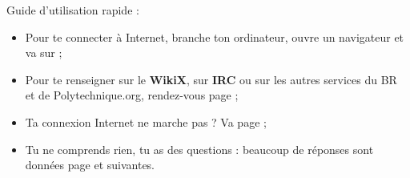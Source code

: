 
Guide d'utilisation rapide :
\begin{itemize}
\item Pour te connecter à Internet, branche ton ordinateur, ouvre un navigateur et va sur  ;
\item Pour te renseigner sur le \textbf{WikiX}, sur \textbf{IRC} ou sur les autres services du BR et de Polytechnique.org, rendez-vous page \pageref{services} ;
\item Ta connexion Internet ne marche pas ? Va page \pageref{diagnostic} ;
\item Tu ne comprends rien, tu as des questions : beaucoup de réponses sont données page \pageref{faq} et suivantes.

\end{itemize}
